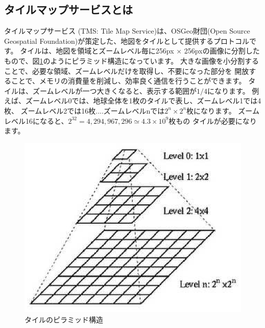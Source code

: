 \documentclass[mingoth,a4paper]{jsarticle}
\begin{document}



\subsection{タイルマップサービスとは}
タイルマップサービス (TMS: Tile Map Service)は、OSGeo財団(Open Source Geospatial Foundation)が策定した、地図をタイルとして提供するプロトコルです。
タイルは、地図を領域とズームレベル毎に256px $\times$ 256pxの画像に分割した
もので、図\ref{fig:tile_pylamid}のようにピラミッド構造になっています。
大きな画像を小分割することで、必要な領域、ズームレベルだけを取得し、不要になった部分を
開放することで、メモリの消費量を削減し、効率良く通信を行うことができます。
タイルは、ズームレベルが一つ大きくなると、表示する範囲が$1/4$になります。
例えば、ズームレベル0では、地球全体を1枚のタイルで表し、ズームレベル1では4枚、
ズームレベル2では16枚....ズームレベルnでは$2^n \times 2^n$枚になります。
ズームレベル16になると、$2^{32} = 4,294,967,296 \simeq 4.3 \times 10^9$枚もの
タイルが必要になります。
%
\begin{figure}[hbp]
\centering
\includegraphics{image201408/Tiling.eps}
\caption{タイルのピラミッド構造\cite{ref:tile}}
\label{fig:tile_pylamid}
\end{figure}
\end{document}
